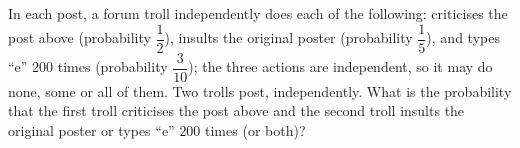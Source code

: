 In each post, a forum troll independently does each of the following: criticises the post above (probability $\dfrac12$), insults the original poster (probability $\dfrac15$), and types ``e'' $200$ times (probability $\dfrac3{10}$); the three actions are independent, so it may do none, some or all of them. Two trolls post, independently. What is the probability that the first troll criticises the post above and the second troll insults the original poster or types ``e'' $200$ times (or both)?
